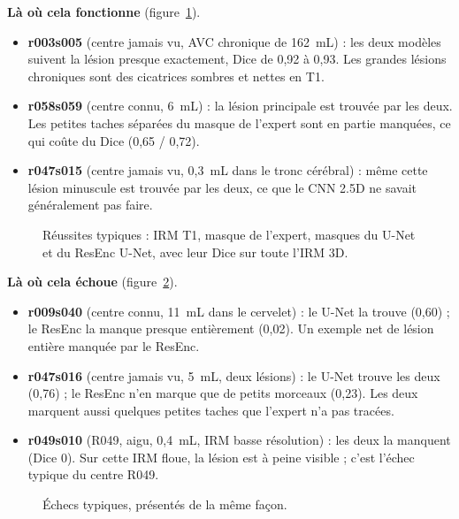 \textbf{Là où cela fonctionne} (figure~\ref{fig:anas-reussites}).
\begin{itemize}
  \item \textbf{r003s005} (centre jamais vu, AVC chronique de 162~mL) : les deux modèles suivent la lésion presque exactement, Dice de 0,92 à 0,93. Les grandes lésions chroniques sont des cicatrices sombres et nettes en T1.
  \item \textbf{r058s059} (centre connu, 6~mL) : la lésion principale est trouvée par les deux. Les petites taches séparées du masque de l'expert sont en partie manquées, ce qui coûte du Dice (0,65 / 0,72).
  \item \textbf{r047s015} (centre jamais vu, 0,3~mL dans le tronc cérébral) : même cette lésion minuscule est trouvée par les deux, ce que le CNN 2.5D ne savait généralement pas faire.
\end{itemize}

\begin{figure}[htbp]
  \centering
  \caption{Réussites typiques : IRM T1, masque de l'expert, masques du U-Net et du ResEnc U-Net, avec leur Dice sur toute l'IRM 3D.}
  \label{fig:anas-reussites}
\end{figure}

\textbf{Là où cela échoue} (figure~\ref{fig:anas-echecs}).
\begin{itemize}
  \item \textbf{r009s040} (centre connu, 11~mL dans le cervelet) : le U-Net la trouve (0,60) ; le ResEnc la manque presque entièrement (0,02). Un exemple net de lésion entière manquée par le ResEnc.
  \item \textbf{r047s016} (centre jamais vu, 5~mL, deux lésions) : le U-Net trouve les deux (0,76) ; le ResEnc n'en marque que de petits morceaux (0,23). Les deux marquent aussi quelques petites taches que l'expert n'a pas tracées.
  \item \textbf{r049s010} (R049, aigu, 0,4~mL, IRM basse résolution) : les deux la manquent (Dice 0). Sur cette IRM floue, la lésion est à peine visible ; c'est l'échec typique du centre R049.
\end{itemize}

\begin{figure}[htbp]
  \centering
  \caption{Échecs typiques, présentés de la même façon.}
  \label{fig:anas-echecs}
\end{figure}

